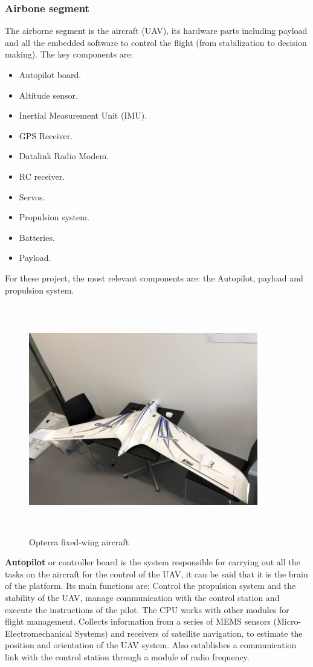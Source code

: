 \subsubsection{Airbone segment}
The airborne segment is the aircraft (UAV), its hardware parts including payload and all the embedded software to control the flight (from stabilization to decision making). The key components are:
\begin{itemize}
    \item Autopilot board.
    \item Altitude sensor.
    \item Inertial Measurement Unit (IMU).
    \item GPS Receiver.
    \item Datalink Radio Modem.
    \item RC receiver.
    \item Servos.
    \item Propulsion system.
    \item Batteries.
    \item Payload.
\end{itemize}
For these project, the most relevant components are: the Autopilot, payload and propulsion system.
\begin{figure}[H]
\centering
\includegraphics[width=10cm,height=10cm,keepaspectratio]{imagenes/opterra.jpg}
\caption{Opterra fixed-wing aircraft}
\label{fig:Optera}
\end{figure}
\textbf{ Autopilot} or controller board is the system responsible for carrying out all the tasks on the aircraft for the control of the UAV, it can be said that it is the brain of the platform. Its main functions are: Control the propulsion system and the stability of the UAV, manage communication with the control station and execute the instructions of the pilot. The CPU works with other modules for flight management. Collects information from a series of MEMS sensors (Micro-Electromechanical Systems) and receivers of satellite navigation, to estimate the position and orientation of the UAV system. Also establishes a communication link with the control station through a module of radio frequency.\cite{Edgar}

